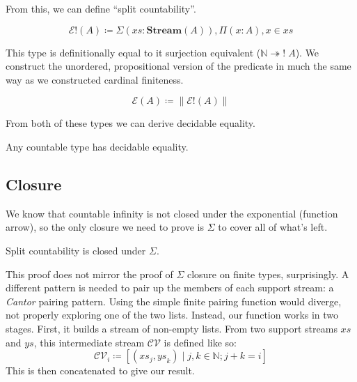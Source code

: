 From this, we can define ``split countability''.
\begin{romdefinition}
  \begin{equation}
    \mathcal{E}!(A) \coloneqq \Sigma {(\mathit{xs} : \mathbf{Stream}(A))} , \Pi {(x : A)} , x \in \mathit{xs}
  \end{equation}
\end{romdefinition}
This type is definitionally equal to it surjection equivalent (\(\mathbb{N}
\twoheadrightarrow ! \; A\)).
We construct the unordered, propositional version of the predicate in much the
same way as we constructed cardinal finiteness.
\begin{romdefinition}[Countability]
  \begin{equation}
    \mathcal{E}(A) \coloneqq \lVert \mathcal{E}!(A) \rVert
  \end{equation}
\end{romdefinition}

From both of these types we can derive decidable equality.
\begin{romlemma}
  Any countable type has decidable equality.
\end{romlemma}
\subsection{Closure}
We know that countable infinity is not closed under the exponential (function
arrow), so the only closure we need to prove is \(\Sigma\) to cover all of
what's left.
\begin{romtheorem} \label{split-countability-sigma}
  Split countability is closed under \(\Sigma\).
\end{romtheorem}
This proof does not mirror the proof of \(\Sigma\) closure on finite types,
surprisingly.
A different pattern is needed to pair up the members of each support stream: a
\emph{Cantor} pairing pattern.
Using the simple finite pairing function would diverge, not properly exploring
one of the two lists.
Instead, our function works in two stages.
First, it builds a stream of non-empty lists.
From two support streams \(\mathit{xs}\) and \(\mathit{ys}\), this intermediate
stream \(\mathcal{CV}\) is defined like so:
\begin{equation}
  \mathcal{CV}_i \coloneqq \left[ (\mathit{xs}_j , \mathit{ys}_k) \mid j, k \in \mathbb{N}; j + k = i \right]
\end{equation}
This is then concatenated to give our result.

